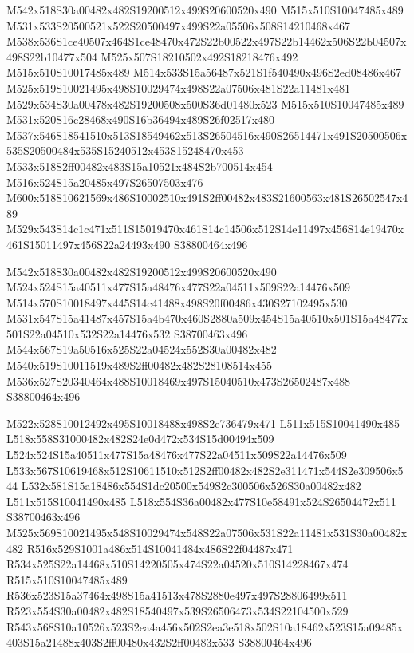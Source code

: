 \documentclass{article}
\begin{document}
\begin{multicols}{2}
M542x518S30a00482x482S19200512x499S20600520x490 M515x510S10047485x489 M531x533S20500521x522S20500497x499S22a05506x508S14210468x467 M538x536S1ce40507x464S1ce48470x472S22b00522x497S22b14462x506S22b04507x498S22b10477x504 M525x507S18210502x492S18218476x492 M515x510S10017485x489 M514x533S15a56487x521S1f540490x496S2ed08486x467 M525x519S10021495x498S10029474x498S22a07506x481S22a11481x481 M529x534S30a00478x482S19200508x500S36d01480x523 M515x510S10047485x489 M531x520S16c28468x490S16b36494x489S26f02517x480 M537x546S18541510x513S18549462x513S26504516x490S26514471x491S20500506x535S20500484x535S15240512x453S15248470x453 M533x518S2ff00482x483S15a10521x484S2b700514x454 M516x524S15a20485x497S26507503x476 M600x518S10621569x486S10002510x491S2ff00482x483S21600563x481S26502547x489 M529x543S14c1c471x511S15019470x461S14c14506x512S14e11497x456S14e19470x461S15011497x456S22a24493x490 S38800464x496

M542x518S30a00482x482S19200512x499S20600520x490 M524x524S15a40511x477S15a48476x477S22a04511x509S22a14476x509 M514x570S10018497x445S14c41488x498S20f00486x430S27102495x530 M531x547S15a41487x457S15a4b470x460S2880a509x454S15a40510x501S15a48477x501S22a04510x532S22a14476x532 S38700463x496 M544x567S19a50516x525S22a04524x552S30a00482x482 M540x519S10011519x489S2ff00482x482S28108514x455 M536x527S20340464x488S10018469x497S15040510x473S26502487x488 S38800464x496

M522x528S10012492x495S10018488x498S2e736479x471 L511x515S10041490x485 L518x558S31000482x482S24e0d472x534S15d00494x509 L524x524S15a40511x477S15a48476x477S22a04511x509S22a14476x509 L533x567S10619468x512S10611510x512S2ff00482x482S2e311471x544S2e309506x544 L532x581S15a18486x554S1dc20500x549S2c300506x526S30a00482x482 L511x515S10041490x485 L518x554S36a00482x477S10e58491x524S26504472x511 S38700463x496 M525x569S10021495x548S10029474x548S22a07506x531S22a11481x531S30a00482x482 R516x529S1001a486x514S10041484x486S22f04487x471 R534x525S22a14468x510S14220505x474S22a04520x510S14228467x474 R515x510S10047485x489 R536x523S15a37464x498S15a41513x478S2880e497x497S28806499x511 R523x554S30a00482x482S18540497x539S26506473x534S22104500x529 R543x568S10a10526x523S2ea4a456x502S2ea3e518x502S10a18462x523S15a09485x403S15a21488x403S2ff00480x432S2ff00483x533 S38800464x496


\end{multicols}
\end{document}
